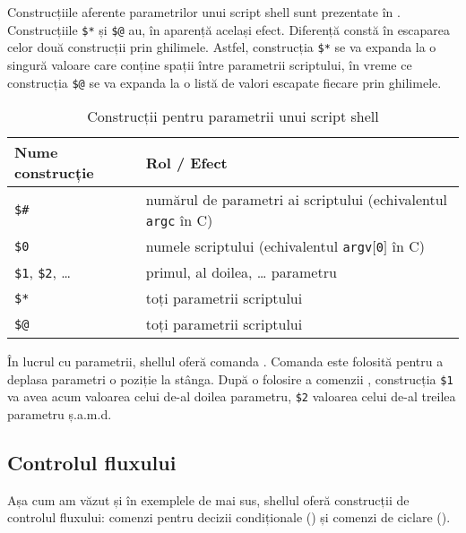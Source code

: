 Construcțiile aferente parametrilor unui script shell sunt prezentate în .
Construcțiile \texttt{\$*} și \texttt{\$@} au, în aparență același efect.
Diferență constă în escaparea celor două construcții prin ghilimele.
Astfel, construcția \texttt{\$*} se va expanda la o singură valoare care conține spații între parametrii scriptului, în vreme ce construcția \texttt{\$@} se va expanda la o listă de valori escapate fiecare prin ghilimele.

\begin{table}[!htb]
  \begin{center}
    \begin{tabular}{ p{} p{} }
      \toprule
        \textbf{Nume construcție} &
        \textbf{Rol / Efect} \\
      \midrule
        \texttt{\$\#} &
        numărul de parametri ai scriptului (echivalentul \texttt{argc} în C) \\
      \midrule
        \texttt{\$0} &
        numele scriptului (echivalentul \texttt{argv$[$0$]$} în C) \\
      \midrule
        \texttt{\$1}, \texttt{\$2}, \ldots &
        primul, al doilea, \ldots{} parametru\\
      \midrule
        \texttt{\$*} &
        toți parametrii scriptului\\
      \midrule
        \texttt{\$@} &
        toți parametrii scriptului \\
      \bottomrule
    \end{tabular}
  \end{center}
  \caption{Construcții pentru parametrii unui script shell}
  \label{tab:auto:script-params}
\end{table}

În lucrul cu parametrii, shellul oferă comanda .
Comanda  este folosită pentru a deplasa parametri o poziție la stânga.
După o folosire a comenzii , construcția \texttt{\$1} va avea acum valoarea celui de-al doilea parametru, \texttt{\$2} valoarea celui de-al treilea parametru ș.a.m.d.

\subsection{Controlul fluxului}
\label{sec:auto:script-func:flow-control}

Așa cum am văzut și în exemplele de mai sus, shellul oferă construcții de
controlul fluxului: comenzi pentru decizii condiționale () și comenzi de
ciclare ().

